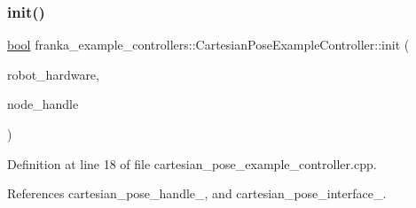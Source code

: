\subsubsection{\texorpdfstring{init()}{init()}}
{\footnotesize\ttfamily \hyperlink{classbool}{bool} franka\+\_\+example\+\_\+controllers\+::\+Cartesian\+Pose\+Example\+Controller\+::init (\begin{DoxyParamCaption}\item[{hardware\+\_\+interface\+::\+Robot\+HW $\ast$}]{robot\+\_\+hardware,  }\item[{ros\+::\+Node\+Handle \&}]{node\+\_\+handle }\end{DoxyParamCaption})\hspace{0.3cm}{\ttfamily [override]}}



Definition at line 18 of file cartesian\+\_\+pose\+\_\+example\+\_\+controller.\+cpp.



References cartesian\+\_\+pose\+\_\+handle\+\_\+, and cartesian\+\_\+pose\+\_\+interface\+\_\+.


